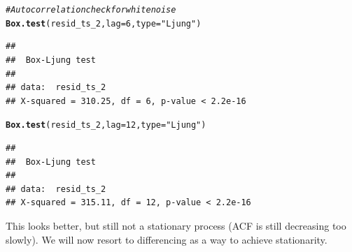 \documentclass{article}\usepackage[]{graphicx}\usepackage[]{color}
\makeatletter
\newcommand{\hlnum}[1]{\textcolor[rgb]{0.686,0.059,0.569}{#1}}%
\newcommand{\hlstr}[1]{\textcolor[rgb]{0.192,0.494,0.8}{#1}}%
\newcommand{\hlcom}[1]{\textcolor[rgb]{0.678,0.584,0.686}{\textit{#1}}}%
\newcommand{\hlstd}[1]{\textcolor[rgb]{0.345,0.345,0.345}{#1}}%
\newcommand{\hlkwc}[1]{\textcolor[rgb]{0.333,0.667,0.333}{#1}}%
\newcommand{\hlkwd}[1]{\textcolor[rgb]{0.737,0.353,0.396}{\textbf{#1}}}%
\newenvironment{kframe}{%
 \def\at@end@of@kframe{}%
 \ifinner\ifhmode%
  \def\at@end@of@kframe{\end{minipage}}%
  \begin{minipage}{\columnwidth}%
 \fi\fi%
 \def\FrameCommand##1{\hskip\@totalleftmargin \hskip-\fboxsep
 \colorbox{shadecolor}{##1}\hskip-\fboxsep
     \hskip-\linewidth \hskip-\@totalleftmargin \hskip\columnwidth}%
 \MakeFramed {\advance\hsize-\width
   \@totalleftmargin\z@ \linewidth\hsize
   \@setminipage}}%
 {\par\unskip\endMakeFramed%
 \at@end@of@kframe}
\newenvironment{knitrout}{}{} %
\makeatother
\begin{document}
\begin{knitrout}
\begin{kframe}\begin{alltt}
\hlcom{# Autocorrelation check for white noise}
\hlkwd{Box.test}\hlstd{(resid_ts_2,} \hlkwc{lag} \hlstd{=} \hlnum{6}\hlstd{,} \hlkwc{type} \hlstd{=} \hlstr{"Ljung"}\hlstd{)}
\end{alltt}
\begin{verbatim}
## 
## 	Box-Ljung test
## 
## data:  resid_ts_2
## X-squared = 310.25, df = 6, p-value < 2.2e-16
\end{verbatim}
\begin{alltt}
\hlkwd{Box.test}\hlstd{(resid_ts_2,} \hlkwc{lag} \hlstd{=} \hlnum{12}\hlstd{,} \hlkwc{type} \hlstd{=} \hlstr{"Ljung"}\hlstd{)}
\end{alltt}
\begin{verbatim}
## 
## 	Box-Ljung test
## 
## data:  resid_ts_2
## X-squared = 315.11, df = 12, p-value < 2.2e-16
\end{verbatim}
\end{kframe}
\end{knitrout}

This looks better, but still not a stationary process (ACF is still decreasing too slowly). We will now resort to differencing as a way to achieve stationarity. 
\end{document}
